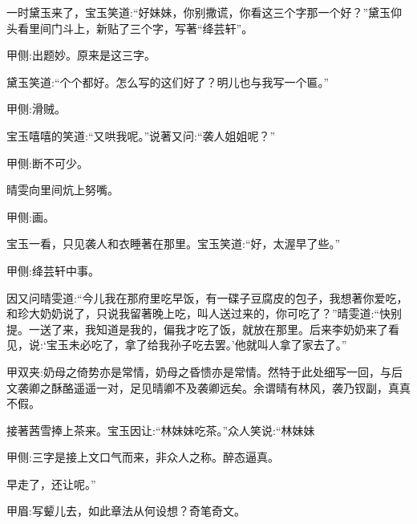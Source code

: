 \begin{parag}
    一时黛玉来了，宝玉笑道:“好妹妹，你别撒谎，你看这三个字那一个好？”黛玉仰头看里间门斗上，新贴了三个字，写著“绛芸轩”。\begin{note}甲侧:出题妙。原来是这三字。\end{note}黛玉笑道:“个个都好。怎么写的这们好了？明儿也与我写一个匾。”\begin{note}甲侧:滑贼。\end{note}宝玉嘻嘻的笑道:“又哄我呢。”说著又问:“袭人姐姐呢？”\begin{note}甲侧:断不可少。\end{note}晴雯向里间炕上努嘴。\begin{note}甲侧:画。\end{note}宝玉一看，只见袭人和衣睡著在那里。宝玉笑道:“好，太渥早了些。”\begin{note}甲侧:绛芸轩中事。\end{note}因又问晴雯道:“今儿我在那府里吃早饭，有一碟子豆腐皮的包子，我想著你爱吃，和珍大奶奶说了，只说我留著晚上吃，叫人送过来的，你可吃了？”晴雯道:“快别提。一送了来，我知道是我的，偏我才吃了饭，就放在那里。后来李奶奶来了看见，说:‘宝玉未必吃了，拿了给我孙子吃去罢。’他就叫人拿了家去了。”\begin{note}甲双夹:奶母之倚势亦是常情，奶母之昏愦亦是常情。然特于此处细写一回，与后文袭卿之酥酪遥遥一对，足见晴卿不及袭卿远矣。余谓晴有林风，袭乃钗副，真真不假。\end{note}接著茜雪捧上茶来。宝玉因让:“林妹妹吃茶。”众人笑说:“林妹妹\begin{note}甲侧:三字是接上文口气而来，非众人之称。醉态逼真。\end{note}早走了，还让呢。”\begin{note}甲眉:写颦儿去，如此章法从何设想？奇笔奇文。\end{note}
\end{parag}


